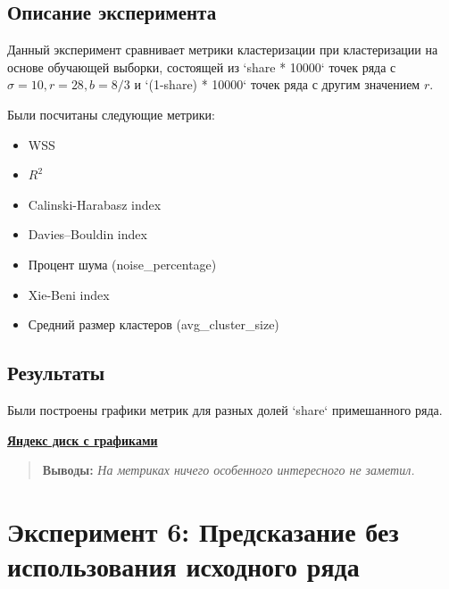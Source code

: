 \documentclass[a4paper, 12pt]{article}
\newenvironment{conclusion}
  {\begin{quote}\noindent\textbf{Выводы: }\itshape}
  {\end{quote}}
\begin{document}
\subsection{Описание эксперимента}
Данный эксперимент сравнивает метрики кластеризации при кластеризации на 
основе обучающей выборки, состоящей из `share * 10000` точек ряда с $\sigma=10,
 r=28, b=8/3$ и `(1-share) * 10000` точек ряда с другим значением $r$.

Были посчитаны следующие метрики:
\begin{itemize}
    \item WSS 
    \item $R^2$
    \item Calinski-Harabasz index
    \item Davies–Bouldin index
    \item Процент шума (noise\_percentage)
    \item Xie-Beni index
    \item Средний размер кластеров (avg\_cluster\_size)
\end{itemize}

\subsection{Результаты}
Были построены графики метрик для разных долей `share` примешанного ряда. 
\vspace{1cm} 
\begin{center}
    \href{https://disk.360.yandex.ru/d/lNCcbHohd4aaiA/%D0%A1%D1%80%D0%B0%D0%B2%D0%BD%D0%B5%D0%BD%D0%B8%D0%B5%20%D0%BC%D0%B5%D1%82%D1%80%D0%B8%D0%BA%20%D0%BA%D0%BB%D0%B0%D1%81%D1%82%D0%B5%D1%80%D0%B8%D0%B7%D0%B0%D1%86%D0%B8%D0%B8}{\textbf{ Яндекс диск с графиками}}
\end{center}
\vspace{1cm}

\begin{conclusion}
    На метриках ничего особенного интересного не заметил.
\end{conclusion}


\section{Эксперимент 6: Предсказание без использования исходного ряда}
\end{document}
